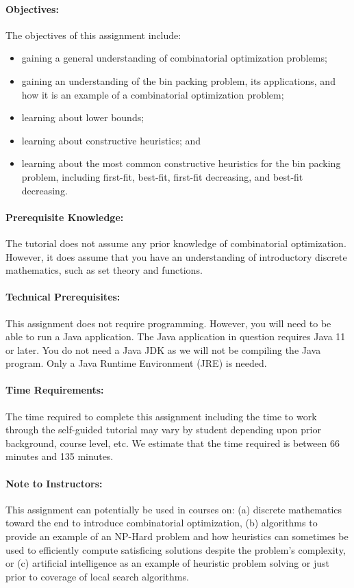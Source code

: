 \documentclass[11pt,letterpaper]{article}
\begin{document}
\paragraph*{Objectives:} The objectives of this assignment include:
\begin{itemize}[leftmargin=*, parsep=0pt, itemsep=2pt, topsep=2pt]
\item gaining a general understanding of combinatorial optimization problems;
\item gaining an understanding of the bin packing problem, its 
applications, and how it is an example of a combinatorial 
optimization problem;
\item learning about lower bounds;
\item learning about constructive heuristics; and
\item learning about the most common constructive heuristics 
for the bin packing problem, including first-fit, best-fit, 
first-fit decreasing, and best-fit decreasing.
\end{itemize}

\paragraph*{Prerequisite Knowledge:} The tutorial does not assume
any prior knowledge of combinatorial optimization. However, it does 
assume that you have an understanding of introductory discrete mathematics,
such as set theory and functions.

\paragraph*{Technical Prerequisites:} This assignment does not require
programming. However, you will need to be able to run a Java application.
The Java application in question requires Java 11 or later. You do not need
a Java JDK as we will not be compiling the Java program. Only a Java Runtime
Environment (JRE) is needed.

\paragraph*{Time Requirements:} The time required to complete this assignment
including the time to work through the self-guided tutorial may vary by
student depending upon prior background, course level, etc. We estimate that
the time required is between 66 minutes and 135 minutes.

\paragraph*{Note to Instructors:} This assignment can potentially be used
in courses on: (a) discrete mathematics toward the end to introduce 
combinatorial optimization, (b) algorithms to provide an example of an
NP-Hard problem and how heuristics can sometimes be used to efficiently
compute satisficing solutions despite the problem's complexity, or (c)
artificial intelligence as an example of heuristic problem solving or
just prior to coverage of local search algorithms.
\end{document}
